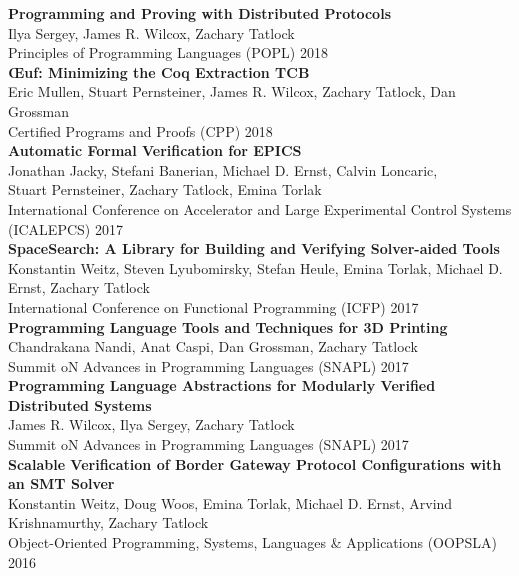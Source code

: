 \documentclass[10pt]{article}
\begin{document}
\textbf{%
Programming and Proving with Distributed Protocols
} \\
Ilya Sergey, James R. Wilcox, Zachary Tatlock \\
Principles of Programming Languages (POPL) 2018 \\

\textbf{%
Œuf: Minimizing the Coq Extraction TCB
} \\
Eric Mullen, Stuart Pernsteiner, James R. Wilcox, Zachary Tatlock, Dan Grossman \\
Certified Programs and Proofs (CPP) 2018 \\

\textbf{%
Automatic Formal Verification for EPICS
} \\
Jonathan Jacky, Stefani Banerian, Michael D. Ernst, Calvin Loncaric, \\
Stuart Pernsteiner, Zachary Tatlock, Emina Torlak \\
International Conference on Accelerator and Large Experimental Control Systems (ICALEPCS) 2017 \\

\textbf{%
SpaceSearch: A Library for Building and Verifying Solver-aided Tools
} \\
Konstantin Weitz, Steven Lyubomirsky, Stefan Heule, Emina Torlak, Michael D. Ernst, Zachary Tatlock \\
International Conference on Functional Programming (ICFP) 2017 \\

\textbf{%
Programming Language Tools and Techniques for 3D Printing
} \\
Chandrakana Nandi, Anat Caspi, Dan Grossman, Zachary Tatlock \\
Summit oN Advances in Programming Languages (SNAPL) 2017 \\

\textbf{%
Programming Language Abstractions for Modularly Verified Distributed Systems
} \\
James R. Wilcox, Ilya Sergey, Zachary Tatlock \\
Summit oN Advances in Programming Languages (SNAPL) 2017 \\

\textbf{%
Scalable Verification of Border Gateway Protocol Configurations with an SMT Solver
} \\
Konstantin Weitz, Doug Woos, Emina Torlak, Michael D. Ernst, Arvind Krishnamurthy, Zachary Tatlock \\
Object-Oriented Programming, Systems, Languages \& Applications (OOPSLA) 2016 \\
\end{document}
